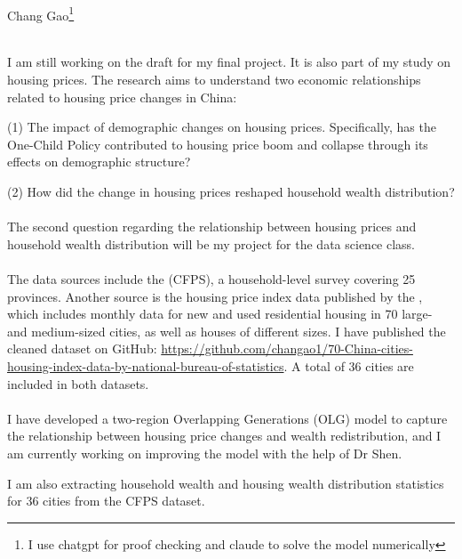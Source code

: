 \documentclass[12pt,letterpaper]{article}
\begin{document}
	\begin{center}
		\smallskip\\
		Chang Gao\footnote{I use chatgpt for proof checking and claude to solve the model numerically}\smallskip\\
	\end{center}
	
	\medskip\\
	I am still working on the draft for my final project. It is also part of my study on housing prices. The research aims to understand two economic relationships related to housing price changes in China:
	
	(1) The impact of demographic changes on housing prices. Specifically, has the One-Child Policy contributed to housing price boom and collapse through its effects on demographic structure?
	
	(2) How did the change in housing prices reshaped household wealth distribution?\smallskip\\
	
	\medskip\\
	The second question regarding the relationship between housing prices and household wealth distribution will be my project for the data science class.\smallskip\\
	
	\medskip\\
	The data sources include the \cite{cfps_database}(CFPS), a household-level survey covering 25 provinces. Another source is the housing price index data published by the \cite{nbs_housing_prices}, which includes monthly data for new and used residential housing in 70 large- and medium-sized cities, as well as houses of different sizes. I have published the cleaned dataset on GitHub: \url{https://github.com/changao1/70-China-cities-housing-index-data-by-national-bureau-of-statistics}. A total of 36 cities are included in both datasets.\smallskip\\
	
	\medskip\\
	I have developed a two-region Overlapping Generations (OLG) model to capture the relationship between housing price changes and wealth redistribution, and I am currently working on improving the model with the help of Dr Shen.
	
	I am also extracting household wealth and housing wealth distribution statistics for 36 cities from the CFPS dataset.
	
\end{document}
